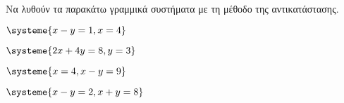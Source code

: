 Να λυθούν τα παρακάτω γραμμικά συστήματα με τη μέθοδο της αντικατάστασης.
\begin{multicols}{2}
\begin{rlist}[leftmargin=5mm]
\item $ \systeme{x-y=1,x=4} $
\item $ \systeme{2x+4y=8,y=3} $
\item $ \systeme{x=4,x-y=9} $
\item $ \systeme{x-y=2,x+y=8} $
\end{rlist}
\end{multicols}
